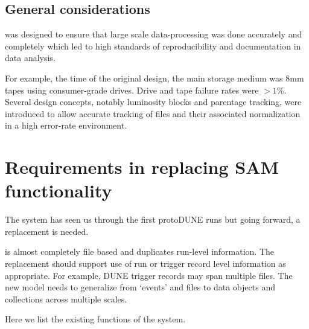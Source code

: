 \documentclass[../main-v1.tex]{subfiles}
\begin{document}
\subsection{General considerations}

 was designed to ensure that large scale data-processing was done accurately and completely  which led to  high standards of reproducibility and documentation in data analysis.

For example, the time of the original design, the main storage medium was 8mm tapes using consumer-grade drives.  Drive and tape failure rates were $> 1$\%.  Several  design concepts, notably luminosity blocks and parentage tracking, were introduced to allow accurate tracking of files and their associated normalization in a high error-rate environment. 

\section{Requirements in replacing SAM functionality}

The  system has seen us through the first protoDUNE runs but going forward, a replacement is needed. 



  is almost completely file based and duplicates run-level information.  The replacement should support use of run or trigger record level information as appropriate. 
For example,  DUNE trigger records may span multiple files. The new model needs to generalize from `events' and files to data objects and collections across multiple scales. 

Here we list the existing functions of the  system. 
\end{document}
